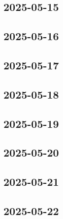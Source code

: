 \documentclass[11pt,a4paper]{article}
\begin{document}


\subsection{2025-05-15}




\subsection{2025-05-16}




\subsection{2025-05-17}




\subsection{2025-05-18}




\subsection{2025-05-19}




\subsection{2025-05-20}




\subsection{2025-05-21}



\subsection{2025-05-22}


\end{document}
